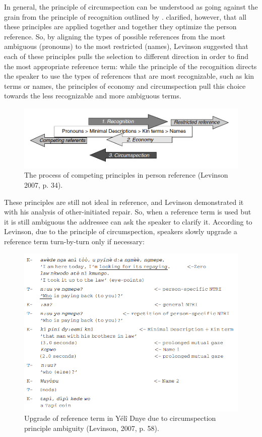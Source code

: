 \documentclass[12pt]{article}
\begin{document}
In general, the principle of circumspection can be understood as going against the grain from the principle of recognition outlined by \textcite{sacks1979}. \textcite{levinson2007} clarified, however, that all these principles are applied together and together they optimize the person reference. So, by aligning the types of possible references from the most ambiguous (pronouns) to the most restricted (names), Levinson suggested that each of these principles pulls the selection to different direction in order to find the most appropriate reference term: while the principle of the recognition directs the speaker to use the types of references that are most recognizable, such as kin terms or names, the principles of economy and circumspection pull this choice towards the less recognizable and more ambiguous terms.
\begin{figure}[h]
\caption{The process of competing principles in person reference (Levinson 2007, p. 34).}
\label{chart}
\includegraphics[width=7in]{chart.png}
\end{figure}
These principles are still not ideal in reference, and Levinson demonstrated it with his analysis of other-initiated repair. So, when a reference term is used but it is still ambiguous the addressee can ask the speaker to clarify it. According to Levinson, due to the principle of circumspection, speakers slowly upgrade a reference term turn-by-turn only if necessary:
\begin{figure}[h]
\caption{Upgrade of reference term in Yélî Dnye due to circumspection principle ambiguity (Levinson, 2007, p. 58).}
\label{levinson}
\includegraphics[width=7in]{levinson.png}
\end{figure}
\end{document}
